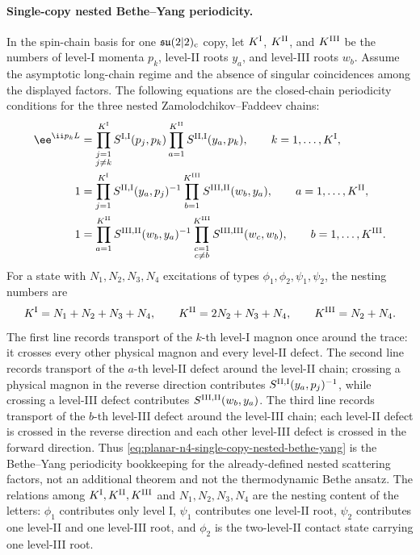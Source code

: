 \paragraph{Single-copy nested Bethe--Yang periodicity.}
In the spin-chain basis for one \(\mathfrak{su}(2|2)_{\rm c}\) copy, let
\(K^{\rm I}\), \(K^{\rm II}\), and \(K^{\rm III}\) be the numbers of
level-I momenta \(p_k\), level-II roots \(y_a\), and level-III roots \(w_b\).
Assume the asymptotic long-chain regime and the absence of singular
coincidences among the displayed factors.  The following equations are the
closed-chain periodicity conditions for the three nested
Zamolodchikov--Faddeev chains:
\begin{equation}
\begin{aligned}
  \ee^{\ii p_kL}
  &=
  \prod_{\substack{j=1\\j\neq k}}^{K^{\rm I}}
  S^{{\rm I},{\rm I}}(p_j,p_k)
  \prod_{a=1}^{K^{\rm II}}
  S^{{\rm II},{\rm I}}(y_a,p_k),
  \qquad
  k=1,\ldots,K^{\rm I},\\
  1
  &=
  \prod_{j=1}^{K^{\rm I}}
  S^{{\rm II},{\rm I}}(y_a,p_j)^{-1}
  \prod_{b=1}^{K^{\rm III}}
  S^{{\rm III},{\rm II}}(w_b,y_a),
  \qquad
  a=1,\ldots,K^{\rm II},\\
  1
  &=
  \prod_{a=1}^{K^{\rm II}}
  S^{{\rm III},{\rm II}}(w_b,y_a)^{-1}
  \prod_{\substack{c=1\\c\neq b}}^{K^{\rm III}}
  S^{{\rm III},{\rm III}}(w_c,w_b),
  \qquad
  b=1,\ldots,K^{\rm III}.
\end{aligned}
  \label{eq:planar-n4-single-copy-nested-bethe-yang}
\end{equation}
For a state with \(N_1,N_2,N_3,N_4\) excitations of types
\(\phi_1,\phi_2,\psi_1,\psi_2\), the nesting numbers are
\[
  K^{\rm I}=N_1+N_2+N_3+N_4,\qquad
  K^{\rm II}=2N_2+N_3+N_4,\qquad
  K^{\rm III}=N_2+N_4.
\]
The first line records transport of the \(k\)-th level-I magnon once around
the trace: it crosses every other physical magnon and every level-II defect.
The second line records transport of the \(a\)-th level-II defect around the
level-II chain; crossing a physical magnon in the reverse direction
contributes \(S^{{\rm II},{\rm I}}(y_a,p_j)^{-1}\), while crossing a
level-III defect contributes \(S^{{\rm III},{\rm II}}(w_b,y_a)\).  The third
line records transport of the \(b\)-th level-III defect around the level-III
chain; each level-II defect is crossed in the reverse direction and each other
level-III defect is crossed in the forward direction.  Thus
\eqref{eq:planar-n4-single-copy-nested-bethe-yang} is the Bethe--Yang
periodicity bookkeeping for the already-defined nested scattering factors,
not an additional theorem and not the thermodynamic Bethe ansatz.  The
relations among \(K^{\rm I},K^{\rm II},K^{\rm III}\) and
\(N_1,N_2,N_3,N_4\) are the nesting content of the letters:
\(\phi_1\) contributes only level I, \(\psi_1\) contributes one level-II root,
\(\psi_2\) contributes one level-II and one level-III root, and \(\phi_2\) is
the two-level-II contact state carrying one level-III root.

